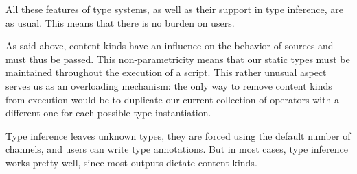 All these features of type systems, as well as their support in
type inference, are as usual.
This means that there is no burden on users.

As said above, content kinds have an influence on the behavior
of sources and must thus be passed. This non-parametricity
means that our static types must be maintained throughout
the execution of a script. This rather unusual aspect serves
us as an overloading mechanism: the only way to remove
content kinds from execution would be to duplicate our current
collection of operators with a different one for each possible
type instantiation.

Type inference leaves unknown types, they are forced using the default
number of channels, and users can write type annotations.
But in most cases, type inference works pretty well, since most
outputs dictate content kinds.
